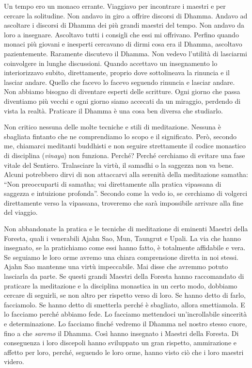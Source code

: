 Un tempo ero un monaco errante. Viaggiavo per incontrare i maestri e per
cercare la solitudine. Non andavo in giro a offrire discorsi di Dhamma.
Andavo ad ascoltare i discorsi di Dhamma dei più grandi maestri del
tempo. Non andavo da loro a insegnare. Ascoltavo tutti i consigli che
essi mi offrivano. Perfino quando monaci più giovani e inesperti
cercavano di dirmi cosa era il Dhamma, ascoltavo pazientemente.
Raramente discutevo il Dhamma. Non vedevo l'utilità di lasciarmi
coinvolgere in lunghe discussioni. Quando accettavo un insegnamento lo
interiorizzavo subito, direttamente, proprio dove sottolineava la
rinuncia e il lasciar andare. Quello che facevo lo facevo seguendo
rinuncia e lasciar andare. Non abbiamo bisogno di diventare esperti
delle scritture. Ogni giorno che passa diventiamo più vecchi e ogni
giorno siamo accecati da un miraggio, perdendo di vista la realtà.
Praticare il Dhamma è una cosa ben diversa che studiarlo.

Non critico nessuna delle molte tecniche e stili di meditazione. Nessuna
è sbagliata fintanto che ne comprendiamo lo scopo e il significato.
Però, secondo me, chiamarci meditanti buddhisti e non seguire
strettamente il codice monastico di disciplina (\emph{vinaya}) non
funziona. Perché? Perché cerchiamo di evitare una fase vitale del
Sentiero. Tralasciare la virtù, il samadhi o la saggezza non va bene.
Alcuni potrebbero dirvi di non attaccarvi alla serenità della
meditazione samatha: ``Non preoccuparti di samatha; vai direttamente
alla pratica vipassana di saggezza e intuizione profonda''. Secondo come
la vedo io, se cerchiamo di volgerci direttamente verso la vipassana,
troveremo che sarà impossibile arrivare alla fine del viaggio.

Non abbandonate la pratica e le tecniche di meditazione di eminenti
Maestri della Foresta, quali i venerabili Ajahn Sao, Mun, Taungrut e
Upali. La via che hanno insegnato, se la pratichiamo come essi hanno
fatto, è totalmente affidabile e vera. Se seguiamo le loro orme avremo
una chiara comprensione diretta in noi stessi. Ajahn Sao mantenne una
virtù impeccabile. Mai disse che avremmo potuto lasciarla da parte. Se
questi grandi Maestri della Foresta hanno raccomandato di praticare la
meditazione e la disciplina monastica in un certo modo, dobbiamo cercare
di seguirli, se non altro per rispetto verso di loro. Se hanno detto di
farlo, facciamolo. Se hanno detto di smetterla perché è sbagliato,
allora smettiamola. E lo facciamo perché abbiamo fede. Lo facciamo
mettendoci un'incrollabile sincerità e determinazione. Lo facciamo
finché vedremo il Dhamma nel nostro stesso cuore, fino a
che \emph{saremo} il Dhamma. Così hanno insegnato i Maestri della
Foresta. Di conseguenza i loro discepoli hanno sviluppato un gran
rispetto, ammirazione e affetto per loro, perché, seguendo le loro orme,
hanno visto ciò che i loro maestri videro.

